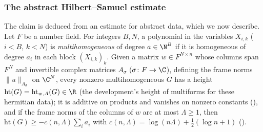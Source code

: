 \subsubsection*{The abstract Hilbert--Samuel estimate}
The claim is deduced from an estimate for abstract data, which we now describe. Let $F$ be a number
field. For integers $B,N$, a polynomial in the variables $X_{i,k}$ ($i<B$, $k<N$) is
\emph{multihomogeneous} of degree $a\in\N^B$ if it is homogeneous of degree $a_i$ in each block
$(X_{i,k})_k$. Given a matrix $w\in F^{N\times n}$ whose columns span $F^N$ and invertible complex
matrices $A_\sigma$ ($\sigma\colon F\to\C$), defining the frame norms $\|u\|_{A_\sigma}$ on $\C^N$, every
nonzero multihomogeneous $G$ has a height $\mathrm{ht}(G)=\mathrm{ht}_{w,A}(G)\in\R$ (the development's
height of multiforms for these hermitian data); it is additive on products and vanishes on nonzero
constants (), and if the frame norms of the columns of $w$ are at
most $\Lambda\ge1$, then $\mathrm{ht}(G)\ge-c(n,\Lambda)\sum_ia_i$ with
$c(n,\Lambda)=\log(n\Lambda)+\frac12(\log n+1)$ ().

